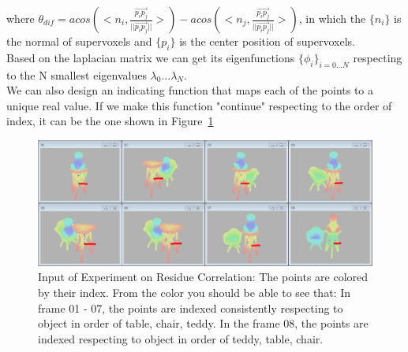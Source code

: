 where $\theta_{dif}=acos(<n_i,\frac{\overrightarrow{p_ip_j}}{||\overrightarrow{p_ip_j}||}>) - acos(<n_j,\frac{\overrightarrow{p_ip_j}}{||\overrightarrow{p_ip_j}||}>)$, in which the $\{n_i\}$ is the normal of supervoxels and $\{p_i\}$ is the center position of supervoxels.\\
Based on the laplacian matrix we can get its eigenfunctions $\{\phi_i\}_{i=0...N}$ respecting to the N smallest eigenvalues $\lambda_0...\lambda_N$.\\ 
We can also design an indicating function that maps each of the points to a unique real value. If we make this function "continue" respecting to the order of index, it can be the one shown in Figure~\ref{fig:indicating_function}   
\begin{figure}
	\centering
	\includegraphics[width=\textwidth]{images/exp_res/inputs.png}
	\caption{Input of Experiment on Residue Correlation: The points are colored by their index. From the color you should be able to see that: In frame 01 - 07, the points are indexed consistently respecting to object in order of table, chair, teddy. In the frame 08, the points are indexed respecting to object in order of teddy, table, chair.}
	\label{fig:indicating_function}
\end{figure}
